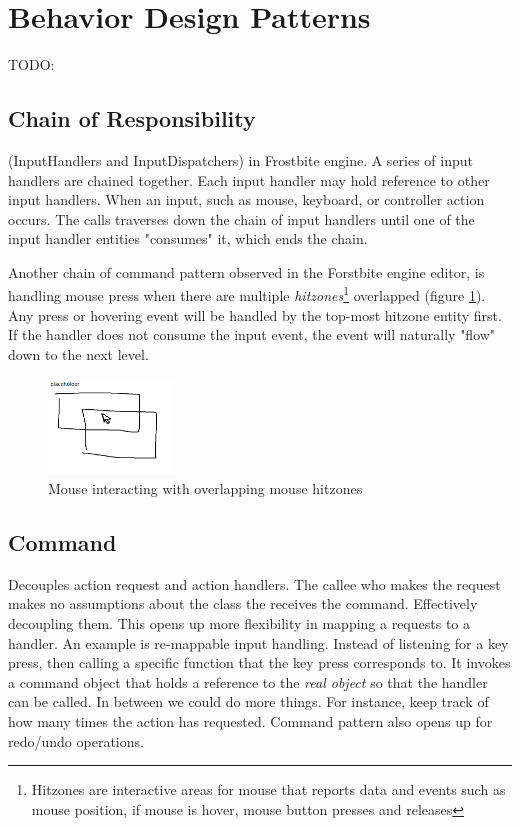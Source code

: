 \section{Behavior Design Patterns}

\iftwocolumns
\begin{multicols}{2}
\fi

TODO:

\subsection{Chain of Responsibility}

(InputHandlers and InputDispatchers) in Frostbite engine. A series of input handlers are chained together. Each input handler may hold reference to other input handlers.
\bs
When an input, such as mouse, keyboard, or controller action occurs. The calls traverses down the chain of input handlers until one of the input handler entities "consumes" it, which ends the chain.
\bs

Another chain of command pattern observed in the Forstbite engine editor, is handling mouse press when there are multiple \textit{hitzones}\footnote{Hitzones are interactive areas for mouse that reports data and events such as mouse position, if mouse is hover, mouse button presses and releases} overlapped (figure \ref{fig:chainofcommand-mousezones}). Any press or hovering event will be handled by the top-most hitzone entity first. If the handler does not consume the input event, the event will naturally "flow" down to the next level.
\bs

\begin{figure}[H]
	\centering
	\includegraphics[width=0.3\textwidth]{assets/chainofcommand_mousezones}
	\caption{Mouse interacting with overlapping mouse hitzones}
	\label{fig:chainofcommand-mousezones}
\end{figure}

\subsection{Command}

Decouples action request and action handlers. The callee who makes the request makes no assumptions about the class the receives the command. Effectively decoupling them.
\bs
This opens up more flexibility in mapping a requests to a handler. An example is re-mappable input handling. Instead of listening for a key press, then calling a specific function that the key press corresponds to. It invokes a command object that holds a reference to the \textit{real object} so that the handler can be called.
\bs
In between we could do more things. For instance, keep track of how many times the action has requested.
\bs
Command pattern also opens up for redo/undo operations.


\end{multicols}
